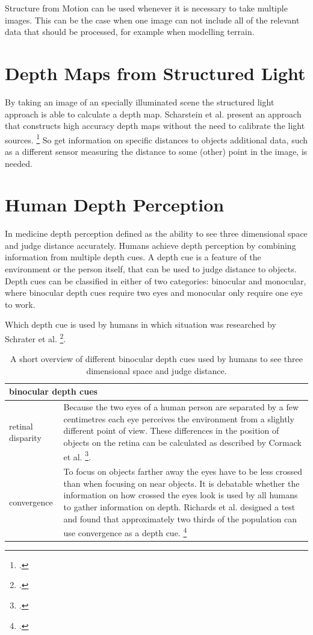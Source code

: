 Structure from Motion can be used whenever it is necessary to take multiple images. This can be the case when one image can not include all of the relevant data that should be processed, for example when modelling terrain.

\section{Depth Maps from Structured Light}
By taking an image of an specially illuminated scene the structured light approach is able to calculate a depth map. Scharstein et al. present an approach that constructs high accuracy depth maps without the need to calibrate the light sources. \footcite{Scharstein_High-accuracy_stereo_depth_maps_using_structured_light} So get information on specific distances to objects additional data, such as a different sensor measuring the distance to some (other) point in the image, is needed.

\section{Human Depth Perception}
In medicine depth perception defined as the ability to see three dimensional space and judge distance accurately. Humans achieve depth perception by combining information from multiple depth cues. A depth cue is a feature of the environment or the person itself, that can be used to judge distance to objects. Depth cues can be classified in either of two categories: binocular and monocular, where binocular depth cues require two eyes and monocular only require one eye to work.

Which depth cue is used by humans in which situation was researched by Schrater et al. \footcite{Schrater_How_optimal_depth_cue_integration_depends_on_the_task}.

\begin{table}[h!]
	\begin{tabularx}{\textwidth}{|l|X|}
		\hline
		\multicolumn{2}{|l|}{\textbf{binocular depth cues}} \\
		\hline
		retinal disparity & Because the two eyes of a human person are separated by a few centimetres each eye perceives the environment from a slightly different point of view. These differences in the position of objects on the retina can be calculated as described by Cormack et al. \footcite{Cormack_The_computation_of_retinal_disparity}.\\
		\hline
		convergence & To focus on objects farther away the eyes have to be less crossed than when focusing on near objects. It is debatable whether the information on how crossed the eyes look is used by all humans to gather information on depth. Richards et al. designed a test and found that approximately two thirds of the population can use convergence as a depth cue. \footcite{Richards_Convergence_as_a_cue_to_depth} \\
		\hline
	\end{tabularx}
	\label{tab:study_of_literature_binocular_depth_cues}
	\caption{A short overview of different binocular depth cues used by humans to see three dimensional space and judge distance.}
\end{table}

